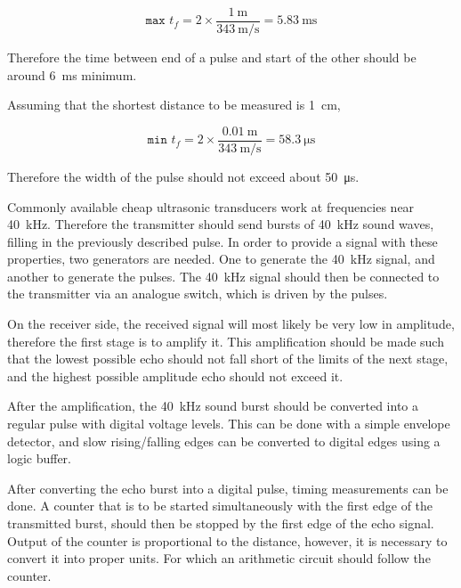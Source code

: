 \documentclass[12pt, a4paper]{article}
\begin{document}
        \begin{equation}
            \texttt{max }t_f = 2 \times \frac{\SI{1}{\metre}}{\SI{343}{\metre\per\second}} = \SI{5.83}{\milli\second}
        \end{equation}

        \noindent Therefore the time between end of a pulse and start of the other should be around \SI{6}{\milli\second} minimum. 

        \noindent Assuming that the shortest distance to be measured is \SI{1}{\centi\metre}, 

        \begin{equation}
            \texttt{min }t_f = 2 \times \frac{\SI{0.01}{\metre}}{\SI{343}{\metre\per\second}} = \SI{58.3}{\micro\second}
        \end{equation}

        \noindent Therefore the width of the pulse should not exceed about \SI{50}{\micro\second}.


        \bigskip
        Commonly available cheap ultrasonic transducers work at frequencies near \SI{40}{\kilo\hertz}. Therefore the transmitter should send bursts of \SI{40}{\kilo\hertz} sound waves, filling in the previously described pulse. In order to provide a signal with these properties, two generators are needed. One to generate the \SI{40}{\kilo\hertz} signal, and another to generate the pulses. The \SI{40}{\kilo\hertz} signal should then be connected to the transmitter via an analogue switch, which is driven by the pulses.

        \bigskip
        On the receiver side, the received signal will most likely be very low in amplitude, therefore the first stage is to amplify it. This amplification should be made such that the lowest possible echo should not fall short of the limits of the next stage, and the highest possible amplitude echo should not exceed it.
        
        \bigskip
        After the amplification, the \SI{40}{\kilo\hertz} sound burst should be converted into a regular pulse with digital voltage levels. This can be done with a simple envelope detector, and slow rising/falling edges can be converted to digital edges using a logic buffer. 

        \bigskip
        After converting the echo burst into a digital pulse, timing measurements can be done. A counter that is to be started simultaneously with the first edge of the transmitted burst, should then be stopped by the first edge of the echo signal. Output of the counter is proportional to the distance, however, it is necessary to convert it into proper units. For which an arithmetic circuit should follow the counter.
\end{document}
